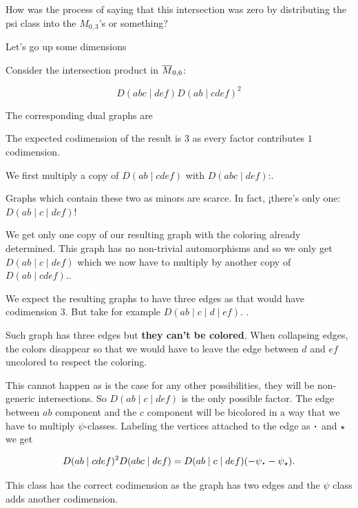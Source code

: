 \documentclass[12pt]{memoir}
\begin{document}
\begin{ptcb}
    \begin{Qn}
        How was the process of saying that this intersection was zero by distributing the psi class into the \(M_{0,3}\)'s or something?
    \end{Qn}
\end{ptcb}

Let's go up some dimensions

\begin{Ex}
    Consider the intersection product in \(\overline{M}_{0,6}\):

    \[D(abc\mid def) D(ab\mid cdef)^2 \]

    The corresponding dual graphs are \par
    The expected codimension of the result is \(3\) as every factor contributes \(1\) codimension.\par

    We first multiply a copy of \(D(ab\mid cdef)\) with \(D(abc\mid def)\):.\par

    Graphs which contain these two as minors are scarce. In fact, ¡there's only one: \(D(ab\mid c\mid def)\)!\par

    We get only one copy of our resulting graph with the coloring already determined.
    This graph has no non-trivial automorphisms and so we only get \(D(ab\mid c\mid def)\) which we now have to multiply by another copy of \(D(ab\mid cdef)\)..\par

    We expect the resulting graphs to have three edges as that would have codimension \(3\). But take for example \(D(ab\mid c\mid d\mid ef)\). .\par

    Such graph has three edges but \textbf{they can't be colored}. When collapsing edges, the colors disappear so that we would have to leave the edge between \(d\) and \(ef\) uncolored to respect the coloring.\par
    This cannot happen as is the case for any other possibilities, they will be non-generic intersections. So \(D(ab\mid c\mid def)\) is the only possible factor. The edge between \(ab\) component and the \(c\) component will be bicolored in a way that we have to multiply \(\psi\)-classes. Labeling the vertices attached to the edge as \(\.\) and \(\star\) we get

    \[D(ab\mid cdef)^2 D(abc\mid def)=D(ab\mid c\mid def)(-\psi_\.-\psi_\star).\]

    This class has the correct codimension as the graph has two edges and the \(\psi\) class adds another codimension.
\end{Ex}
\end{document}
